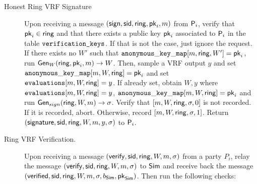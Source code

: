 \begin{tcolorbox}[colback=white]
{\begin{description}
	\item[Honest Ring VRF Signature] Upon receiving a message $(\mathsf{sign}, \textsf{sid}, \mathsf{ring}, \mathsf{pk}_i, m)$ from $\mathsf{P}_i$, verify that $\mathsf{pk}_i \in \mathsf{ring}$ and that there exists a public key $\mathsf{pk}_i$ associated to $\mathsf{P}_i$ in the table $ \texttt{verification\_keys} $. If that is not the case, just ignore the request. 	
	If there exists no $ W' $ such that $ \mathtt{anonymous\_key\_map}[m, \mathsf{ring},W'] =  \mathsf{pk}_i $, run $ \mathsf{Gen}_W(\mathsf{ring}, \mathsf{pk}_i, m) \rightarrow W$. Then, sample a VRF output $y$ and set $ \mathtt{anonymous\_key\_map}[m,W,\mathsf{ring}] = \mathsf{pk}_i $ and set $ \texttt{evaluations}[m, W,\mathsf{ring}] = y$.
	If already set, obtain $ W, y $ where  $ \texttt{evaluations}[m, W, \mathsf{ring}] = y$, $ \mathtt{anonymous\_key\_map}[m,W,\mathsf{ring}] =\mathsf{pk}_i $ and run  $ \mathsf{Gen}_{sign}(\mathsf{ring}, W, m) \rightarrow \sigma $. Verify that $ [m, W,\mathsf{ring}, \sigma, 0] $ is not recorded. {\color{blue}If it is recorded}, abort. 
	Otherwise, record $ [m, W, \mathsf{ring},\sigma, 1] $. Return $(\mathsf{signature}, \textsf{sid}, \mathsf{ring},W,m, y, \sigma)$ to $\mathsf{P}_i$.
	
	\item[Ring VRF Verification.] Upon receiving a message $(\mathsf{verify}, \textsf{sid}, \mathsf{ring},W, m, \sigma)$ from a party $P_i$, relay the message $(\mathsf{verify}, \textsf{sid}, \mathsf{ring},W, m, \sigma)$ to $ \mathsf{Sim} $ and receive back the message $(\mathsf{verified}, \textsf{sid}, \mathsf{ring},W, m, \sigma, b_{\mathsf{Sim}}, \mathsf{pk}_{\mathsf{Sim}})$. Then run the following checks: 
\end{description}}
\end{tcolorbox}
